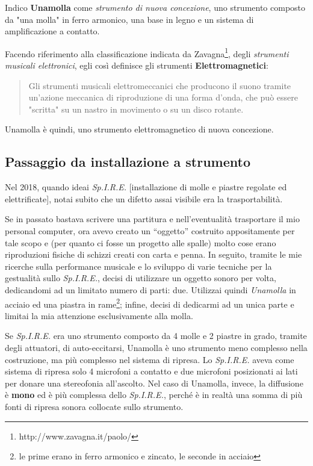 Indico \textbf{Unamolla} come \textit{strumento di nuova concezione}, uno
strumento composto da "una molla" in ferro armonico, una base in legno e un
sistema di amplificazione a contatto.


Facendo riferimento alla classificazione indicata da
Zavagna\footnote{http://www.zavagna.it/paolo/}, %
degli \textit{strumenti musicali elettronici}, egli così definisce gli strumenti
\textbf{Elettromagnetici}:

\begin{quotation}
Gli strumenti musicali elettromeccanici che producono il suono tramite un’azione
meccanica di riproduzione di una forma d’onda, che può essere "scritta" su un
nastro in movimento o su un disco rotante.
\end{quotation}

Unamolla è quindi, uno strumento elettromagnetico di nuova concezione.

\subsection{Passaggio da installazione a strumento}

Nel 2018, quando ideai \emph{Sp.I.R.E.} [installazione di molle e piastre regolate ed
elettrificate], notai subito che un difetto assai visibile era la trasportabilità.

Se in passato bastava scrivere una partitura e nell’eventualità trasportare il
mio personal computer, ora avevo creato un “oggetto” costruito appositamente per
tale scopo e (per quanto ci fosse un progetto alle spalle) molto cose erano
riproduzioni fisiche di schizzi creati con carta e penna. In seguito, tramite le
mie ricerche sulla performance musicale e lo sviluppo di varie tecniche per la
gestualità sullo \emph{Sp.I.R.E.}, decisi di utilizzare un oggetto sonoro per volta,
dedicandomi ad un limitato numero di parti: due. Utilizzai quindi \textit{Unamolla}
in acciaio ed una piastra in rame\footnote{le prime erano in ferro armonico e
zincato, le seconde in acciaio}; infine, decisi di dedicarmi ad un unica parte
e limitai la mia attenzione esclusivamente alla molla.

Se \emph{Sp.I.R.E.} era uno strumento composto da 4 molle e 2 piastre in grado, tramite
degli attuatori, di auto-eccitarsi, Unamolla è uno strumento meno complesso nella
costruzione, ma più complesso nel sistema di ripresa. Lo \emph{Sp.I.R.E.} aveva come
sistema di ripresa solo 4 microfoni a contatto e due microfoni posizionati ai
lati per donare una stereofonia all'ascolto. Nel caso di Unamolla, invece, la
diffusione è \textbf{mono} ed è più complessa dello \emph{Sp.I.R.E.}, perché è in realtà
una somma di più fonti di ripresa sonora collocate sullo strumento.

